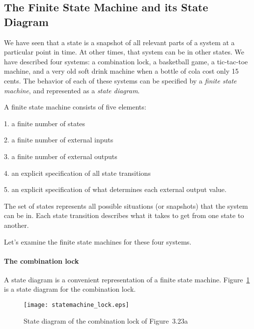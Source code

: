 \documentclass{patt}
\begin{document}
\subsection{The Finite State Machine and its State Diagram}

We have seen that a state is a snapshot of all relevant parts of a
system at a particular point in time.  At other times, that system can
be in other states.  We have described four systems: a combination lock,
a basketball game, a tic-tac-toe machine, and a very old soft drink machine
when a bottle of cola cost only 15 cents. The behavior of each of these systems
can be specified by a {\em finite state machine}, and represented as a 
{\em state diagram}.

A finite state machine consists of five elements:

\begin{list}{}{\small\ttfamily\obeylines
    \settowidth{\labelwidth}{1.}%
    \setlength{\itemsep}{0pt}%
    \addtolength{\leftmargin}{\labelwidth}%
    \addtolength{\leftmargin}{\labelsep}%
    \def\makelabel#1{\hbox to \labelwidth{{#1}\hss}}%
    \setlength{\labelsep}{7pt}\fontsize{9}{10}\selectfont\ttfamily\obeylines\color{seventyblack}}
\item[1.] a finite number of states
\item[2.] a finite number of external inputs
\item[3.] a finite number of external outputs
\item[4.] an explicit specification of all state transitions
\item[5.] an explicit specification of what determines each external
output value.
\end{list}

The set of states represents all possible situations (or snapshots)
that the system can be in.  Each state transition describes what it takes
to get from one state to another.

Let's examine the finite state machines for these four systems.

\paragraph{The combination lock}

A state diagram is a convenient representation of a finite state machine.
Figure~\ref{fig:statemachine_lock} is a state diagram for the combination
lock.

\begin{figure}
\centerline{\texttt{[image: statemachine\_lock.eps]}}
\caption{State diagram of the combination lock of Figure~3.23a}
\label{fig:statemachine_lock}
\end{figure}
\end{document}
